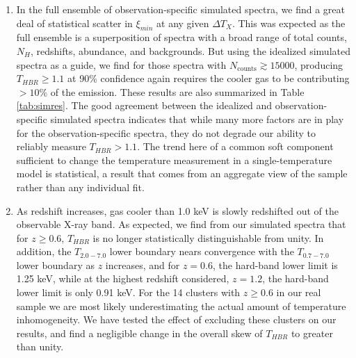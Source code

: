 \begin{enumerate}
\item In the full ensemble of observation-specific simulated spectra,
  we find a great deal of statistical scatter in $\xi_{min}$ at any
  given $\Delta T_X$. This was expected as the full ensemble is a
  superposition of spectra with a broad range of total counts,
  $N_{H}$, redshifts, abundance, and backgrounds. But using the
  idealized simulated spectra as a guide, we find for those spectra
  with $N_{\mathrm{counts}} \gtrsim 15000$, producing $T_{HBR} \geq
  1.1$ at 90\% confidence again requires the cooler gas to be
  contributing $> 10\%$ of the emission. These results are also
  summarized in Table \ref{tab:simres}. The good agreement between the
  idealized and observation-specific simulated spectra indicates that
  while many more factors are in play for the observation-specific
  spectra, they do not degrade our ability to reliably measure
  $T_{HBR} > 1.1$.  The trend here of a common soft component
  sufficient to change the temperature measurement in a
  single-temperature model is statistical, a result that comes from an
  aggregate view of the sample rather than any individual fit.

\item As redshift increases, gas cooler than 1.0 keV is slowly
  redshifted out of the observable X-ray band. As expected, we find
  from our simulated spectra that for $z \geq 0.6$, $T_{HBR}$ is no
  longer statistically distinguishable from unity. In addition, the
  $T_{2.0-7.0}$ lower boundary nears convergence with the
  $T_{0.7-7.0}$ lower boundary as $z$ increases, and for $z = 0.6$,
  the hard-band lower limit is 1.25 keV, while at the highest redshift
  considered, $z = 1.2$, the hard-band lower limit is only 0.91
  keV. For the 14 clusters with $z \geq 0.6$ in our real sample we are
  most likely underestimating the actual amount of temperature
  inhomogeneity. We have tested the effect of excluding these clusters
  on our results, and find a negligible change in the overall skew of
  $T_{HBR}$ to greater than unity.
\end{enumerate}

